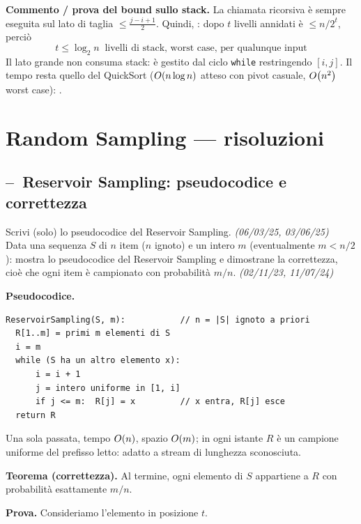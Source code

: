 \textbf{Commento / prova del bound sullo stack.} La chiamata ricorsiva \`e sempre eseguita sul
lato di taglia $\le\frac{j-i+1}{2}$. Quindi, : dopo $t$ livelli annidati \`e $\le n/2^t$, perci\`o
\[
\boxed{\ t\le\log_2 n \ \text{ livelli di stack, worst case, per qualunque input}\ }
\]
Il lato grande non consuma stack: \`e gestito dal ciclo \texttt{while} restringendo $[i,j]$. Il
tempo resta quello del QuickSort ($O\!\left(n\log n\right)$ atteso con pivot casuale, $O\!\left(n^2\right)$ worst case):
.

\section{Random Sampling --- risoluzioni}

\subsection*{--\hot\ Reservoir Sampling: pseudocodice e correttezza}

\begin{domanda}
 Scrivi (solo) lo pseudocodice del Reservoir Sampling. \emph{(06/03/25, 03/06/25)}\\
 Data una sequenza $S$ di $n$ item ($n$ ignoto) e un intero $m$ (eventualmente $m<n/2$):
mostra lo pseudocodice del Reservoir Sampling e dimostrane la correttezza, cio\`e che ogni item
\`e campionato con probabilit\`a $m/n$. \emph{(02/11/23, 11/07/24)}
\end{domanda}

\textbf{Pseudocodice.}
\begin{verbatim}
ReservoirSampling(S, m):           // n = |S| ignoto a priori
  R[1..m] = primi m elementi di S
  i = m
  while (S ha un altro elemento x):
      i = i + 1
      j = intero uniforme in [1, i]
      if j <= m:  R[j] = x         // x entra, R[j] esce
  return R
\end{verbatim}

Una sola passata, tempo $O\!\left(n\right)$, spazio $O\!\left(m\right)$; in ogni istante $R$ \`e un campione uniforme
del prefisso letto: adatto a stream di lunghezza sconosciuta.

\textbf{Teorema (correttezza).} Al termine, ogni elemento di $S$ appartiene a $R$ con
probabilit\`a esattamente $m/n$.

\textbf{Prova.} Consideriamo l'elemento in posizione $t$.

